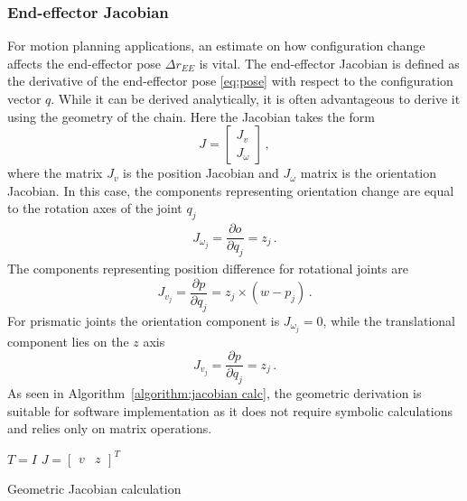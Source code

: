 \documentclass[times, utf8, diplomski, english]{fer}
\begin{document}
\subsubsection{End-effector Jacobian}
For motion planning applications, an estimate on how configuration change affects the end-effector pose $\Delta r_{EE}$ is vital.
The end-effector Jacobian is defined as the derivative of the end-effector pose \ref{eq:pose} with respect to the configuration vector $q$.
While it can be derived analytically, it is often advantageous to derive it using the geometry of the chain.
Here the Jacobian takes the form 
\begin{equation}
J =
\begin{bmatrix}
J_{v} \\ 
J_{\omega}
\end{bmatrix}\, ,
\label{jacob1}
\end{equation}
where the matrix $J_v$ is the position Jacobian and $J_{\omega}$ matrix is the orientation Jacobian.
In this case, the components representing orientation change are equal to the rotation axes of the joint $q_j$
\begin{align}
J_{\omega_j} = \dfrac{\partial o}{\partial q_j} = z_{j}\, .
\end{align}
The components representing position difference for rotational joints are
\begin{equation}
J_{v_j} = \dfrac{\partial p}{ \partial q_{j}} = z_j \times (w - p_j)\, .
\end{equation}
For prismatic joints the orientation component is $J_{\omega_j} = 0$, while the translational component lies on the $z$ axis
\begin{equation}
J_{v_j} = \dfrac{\partial p}{ \partial q_j} = z_j\, .
\end{equation}
As seen in Algorithm~\ref{algorithm:jacobian calc}, the geometric derivation is suitable for software implementation as it does not require symbolic calculations and relies only on matrix operations.
\begin{algorithm}[h]
 $T=I$\;
 $J = \begin{bmatrix}v &z \end{bmatrix}^T$
 \caption{Geometric Jacobian calculation}
 \label{algorithm:jacobian calc}
\end{algorithm}
\end{document}
